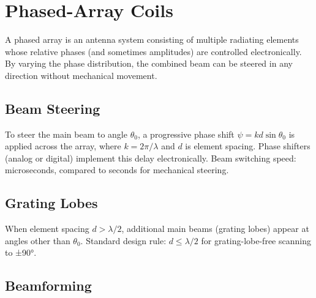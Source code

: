 \section{Phased-Array Coils}\label{sec:wiki_phased_arrays}



A phased array is an antenna system consisting of multiple radiating elements whose relative phases (and sometimes amplitudes) are controlled electronically. By varying the phase distribution, the combined beam can be steered in any direction without mechanical movement.

				

\subsection{Beam Steering}

				


				

To steer the main beam to angle $\theta_0$, a progressive phase shift $\psi = kd\sin\theta_0$ is applied across the array, where $k = 2\pi/\lambda$ and $d$ is element spacing. Phase shifters (analog or digital) implement this delay electronically. Beam switching speed: microseconds, compared to seconds for mechanical steering.


				

\subsection{Grating Lobes}

				

When element spacing $d > \lambda/2$, additional main beams (grating lobes) appear at angles other than $\theta_0$. Standard design rule: $d \leq \lambda/2$ for grating-lobe-free scanning to ±90°.

				

\subsection{Beamforming}

